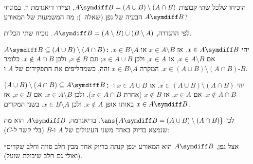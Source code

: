 הוכיחו שלכל שתי קבוצות $A\symdiff B=(A\cup B)\setminus(A\cap B)$, וציירו דיאגרמת ון. במונחי הבעיה של גפן (שאלה~): מה המשמעות של המאורע $A\symdiff B$?
\begin{solbox}
לפי ההגדרה, $A\symdiff B=(A\setminus B)\cup(B\setminus A)$. נוכיח שתי הכלות.

\textbf{$A\symdiff B\subseteq(A\cup B)\setminus(A\cap B)$:} יהי $x\in A\symdiff B$. אז $x\in A\setminus B$ או $x\in B\setminus A$. אם $x\in A\setminus B$, אז $x\in A$, ולכן $x\in A\cup B$; וגם $x\notin B$, ולכן $x\notin A\cap B$. כלומר $x\in(A\cup B)\setminus(A\cap B)$. המקרה $x\in B\setminus A$ זהה, כשמחליפים את התפקידים של $A$ ו-$B$.

\textbf{$(A\cup B)\setminus(A\cap B)\subseteq A\symdiff B$:} יהי $x\in(A\cup B)\setminus(A\cap B)$. אז $x\in A\cup B$ ו-$x\notin A\cap B$. אם $x\in A$, אז $x\notin B$ (אחרת $x\in A\cap B$), ולכן $x\in A\setminus B$. אם $x\in B$, אז באותו אופן $x\notin A$, ולכן $x\in B\setminus A$. בשני המקרים $x\in A\symdiff B$.

לכן $\ans{A\symdiff B=(A\cup B)\setminus(A\cap B)}$. בדיאגרמה, $A\symdiff B$ הוא מה שנמצא בדיוק באחד משני העיגולים של $A$ ו-$B$ (בלי קשר ל-$C$):

\begin{center}
\end{center}

אצל גפן, $A\symdiff B$ הוא המאורע ״גפן קנתה בדיוק אחד מבין חלב סויה וחלב שקדים״ (ואולי גם חלב שיבולת שועל).
\end{solbox}
